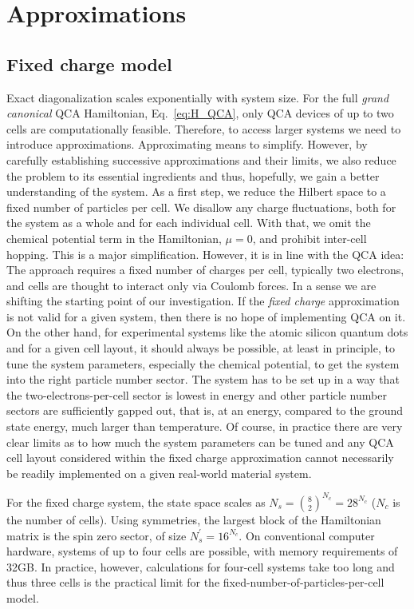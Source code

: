 \chapter{Approximations}
\graphicspath{{../gfx/chapter02/}{../plots/chapter02/}}


\section{Fixed charge model}

Exact diagonalization scales exponentially with system size. For the full
\emph{grand canonical} QCA Hamiltonian, Eq.~\ref{eq:H_QCA}, only QCA devices of
up to two cells are computationally feasible. Therefore, to access larger
systems we need to introduce approximations. Approximating means to simplify.
However, by carefully establishing successive approximations and their limits,
we also reduce the problem to its essential ingredients and thus, hopefully, we
gain a better understanding of the system. As a first step, we reduce the
Hilbert space to a fixed number of particles per cell. We disallow any
charge fluctuations, both for the system as a whole and for each individual
cell. With that, we omit the chemical potential term in the Hamiltonian, $\mu =
0$, and prohibit inter-cell hopping. This is a major simplification. However, it
is in line with the QCA idea: The approach requires a fixed number of charges
per cell, typically two electrons, and cells are thought to interact only via
Coulomb forces. In a sense we are shifting the starting point of our
investigation. If the \emph{fixed charge} approximation is not valid for a given
system, then there is no hope of implementing QCA on it. On the other hand, for
experimental systems like the atomic silicon quantum dots and for a given cell
layout, it should always be possible, at least in principle, to tune the system
parameters, especially the chemical potential, to get the system into the right
particle number sector. The system has to be set up in a way that the
two-electrons-per-cell sector is lowest in energy and other particle number
sectors are sufficiently gapped out, that is, at an energy, compared to the
ground state energy, much larger than temperature. Of course, in practice there
are very clear limits as to how much the system parameters can be tuned and any
QCA cell layout considered within the fixed charge approximation cannot
necessarily be readily implemented on a given real-world material system.

For the fixed charge system, the state space scales as $N_s =
\binom{8}{2}^{N_c} = 28^{N_c}$ ($N_c$ is the number of cells). Using symmetries,
the largest block of the Hamiltonian matrix is the spin zero sector, of size
$N_s^{\prime} = 16^{N_c}$. On conventional computer hardware, systems of up to
four cells are possible, with memory requirements of 32GB. In practice,
however, calculations for four-cell systems take too long and thus three
cells is the practical limit for the fixed-number-of-particles-per-cell
model.


